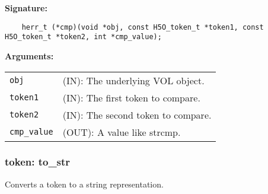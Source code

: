 \begin{mdframed}[style=bgbox]
\textbf{Signature:}
\begin{lstlisting}
    herr_t (*cmp)(void *obj, const H5O_token_t *token1, const H5O_token_t *token2, int *cmp_value);
\end{lstlisting}

\textbf{Arguments:}\\
\begin{tabular}{l p{13.5cm}}
  \texttt{obj} & (IN): The underlying VOL object.\\
  \texttt{token1} & (IN): The first token to compare.\\
  \texttt{token2} & (IN): The second token to compare.\\
  \texttt{cmp\_value} & (OUT): A value like strcmp.\\
\end{tabular}
\end{mdframed}

\subsubsection{token: to\_str}
Converts a token to a string representation.

